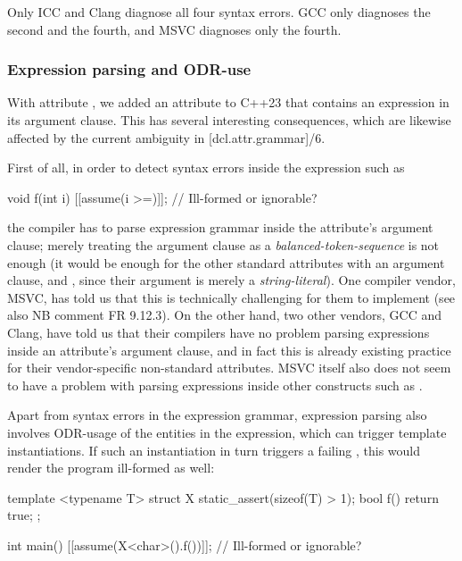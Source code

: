 Only ICC and Clang diagnose all four syntax errors. GCC only diagnoses the second and the fourth, and MSVC diagnoses only the fourth.

\subsubsection{Expression parsing and ODR-use}
\label{subsubsec:odruse}

With attribute  \cite{P1774R8}, we added an attribute to C++23 that contains an expression in its argument clause. This has several interesting consequences, which are likewise affected by the current ambiguity in [dcl.attr.grammar]/6.

First of all, in order to detect syntax errors inside the expression such as
\begin{codeblock}
void f(int i) {
  [[assume(i >=)]];  // Ill-formed or ignorable?
}
\end{codeblock}
the compiler has to parse expression grammar inside the attribute's argument clause; merely treating the argument clause as a \emph{balanced-token-sequence} is not enough (it would be enough for the other standard attributes with an argument clause,  and , since their argument is merely a \emph{string-literal}). One compiler vendor, MSVC, has told us that this is technically challenging for them to implement (see also NB comment FR 9.12.3). On the other hand, two other vendors, GCC and Clang, have told us that their compilers have no problem parsing expressions inside an attribute's argument clause, and in fact this is already existing practice for their vendor-specific non-standard attributes. MSVC itself also does not seem to have a problem with parsing expressions inside other constructs such as .

 Apart from syntax errors in the expression grammar, expression parsing also involves ODR-usage of the entities in the expression, which can trigger template instantiations. If such an instantiation in turn triggers a failing , this would render the program ill-formed as well:
 
\begin{codeblock}
template <typename T>
struct X {
  static_assert(sizeof(T) > 1);
  bool f() { return true; }
};

int main() {
  [[assume(X<char>().f())]];  // Ill-formed or ignorable?
}
\end{codeblock}

